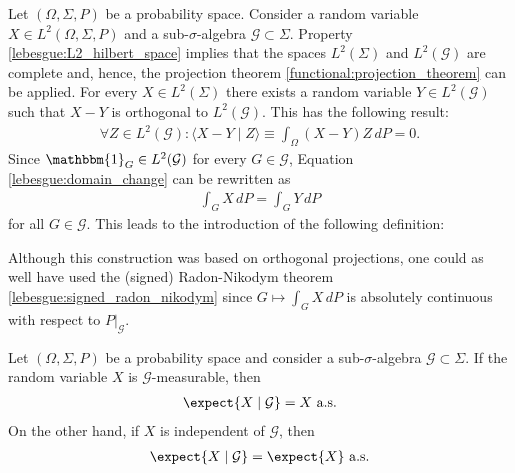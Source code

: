     Let $(\Omega,\Sigma,P)$ be a probability space. Consider a random variable $X\in L^2(\Omega,\Sigma,P)$ and a sub-$\sigma$-algebra $\mathcal{G}\subset\Sigma$. Property \ref{lebesgue:L2_hilbert_space} implies that the spaces $L^2(\Sigma)$ and $L^2(\mathcal{G})$ are complete and, hence, the projection theorem \ref{functional:projection_theorem} can be applied. For every $X\in L^2(\Sigma)$ there exists a random variable $Y\in L^2(\mathcal{G})$ such that $X-Y$ is orthogonal to $L^2(\mathcal{G})$. This has the following result:
    \begin{gather}
        \forall Z\in L^2(\mathcal{G}):\langle X-Y\mid Z \rangle\equiv\int_\Omega(X-Y)Z\,dP = 0.
    \end{gather}
    Since $\mathbbm{1}_G\in L^2(\mathcal{G})$ for every $G\in\mathcal{G}$, Equation \eqref{lebesgue:domain_change} can be rewritten as
    \begin{gather}
        \label{prob:conditional_expectation_condition}
        \int_GX\,dP = \int_GY\,dP
    \end{gather}
    for all $G\in\mathcal{G}$. This leads to the introduction of the following definition:
    \begin{remark}
        Although this construction was based on orthogonal projections, one could as well have used the (signed) Radon-Nikodym theorem \ref{lebesgue:signed_radon_nikodym} since $G\mapsto\int_GX\,dP$ is absolutely continuous with respect to $P|_{\mathcal{G}}$.
    \end{remark}

    \begin{property}\label{prob:conditional_expectation_props}
        Let $(\Omega,\Sigma,P)$ be a probability space and consider a sub-$\sigma$-algebra $\mathcal{G}\subset\Sigma$. If the random variable $X$ is $\mathcal{G}$-measurable, then
        \begin{gather}
            \expect{X\mid\mathcal{G}} = X\text{ a.s.}
        \end{gather}
        On the other hand, if $X$ is independent of $\mathcal{G}$, then
        \begin{gather}
            \expect{X\mid\mathcal{G}} = \expect{X}\text{ a.s.}
        \end{gather}
    \end{property}

